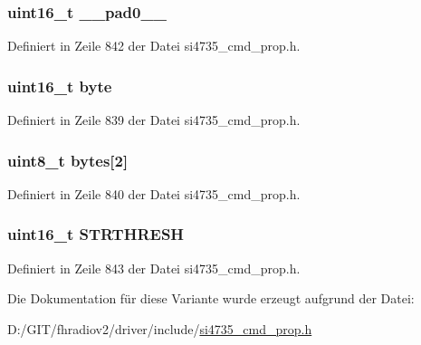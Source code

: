 \subsubsection[{\+\_\+\+\_\+pad0\+\_\+\+\_\+}]{\setlength{\rightskip}{0pt plus 5cm}uint16\+\_\+t \+\_\+\+\_\+pad0\+\_\+\+\_\+}\label{unionfm__blend__rssi__stero__thres_a77132c2c26a75f5b8751b235cda23828}


Definiert in Zeile 842 der Datei si4735\+\_\+cmd\+\_\+prop.\+h.

\hypertarget{unionfm__blend__rssi__stero__thres_ab0549c1b5ea980a02e7eab77e21fea49}{}
\subsubsection[{byte}]{\setlength{\rightskip}{0pt plus 5cm}uint16\+\_\+t byte}\label{unionfm__blend__rssi__stero__thres_ab0549c1b5ea980a02e7eab77e21fea49}


Definiert in Zeile 839 der Datei si4735\+\_\+cmd\+\_\+prop.\+h.

\hypertarget{unionfm__blend__rssi__stero__thres_a46e4c05d20a047ec169f60d3167e912e}{}
\subsubsection[{bytes}]{\setlength{\rightskip}{0pt plus 5cm}uint8\+\_\+t bytes\mbox{[}2\mbox{]}}\label{unionfm__blend__rssi__stero__thres_a46e4c05d20a047ec169f60d3167e912e}


Definiert in Zeile 840 der Datei si4735\+\_\+cmd\+\_\+prop.\+h.

\hypertarget{unionfm__blend__rssi__stero__thres_ae59cc6ed2c20ceb75c5065984e1751d1}{}
\subsubsection[{S\+T\+R\+T\+H\+R\+E\+S\+H}]{\setlength{\rightskip}{0pt plus 5cm}uint16\+\_\+t S\+T\+R\+T\+H\+R\+E\+S\+H}\label{unionfm__blend__rssi__stero__thres_ae59cc6ed2c20ceb75c5065984e1751d1}


Definiert in Zeile 843 der Datei si4735\+\_\+cmd\+\_\+prop.\+h.



Die Dokumentation für diese Variante wurde erzeugt aufgrund der Datei\+:\begin{DoxyCompactItemize}
\item 
D\+:/\+G\+I\+T/fhradiov2/driver/include/\hyperlink{si4735__cmd__prop_8h}{si4735\+\_\+cmd\+\_\+prop.\+h}\end{DoxyCompactItemize}
